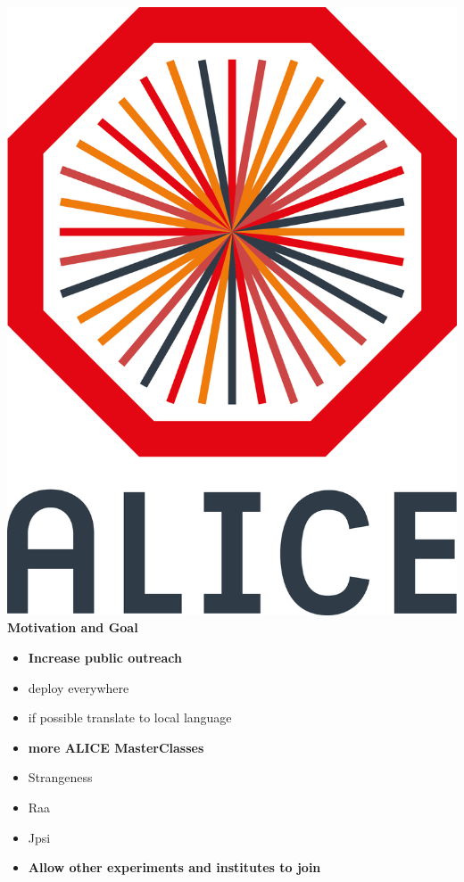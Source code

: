 \documentclass[aspectratio=1610,14pt,dvipsnames]{beamer}
\begin{document}
\begin{frame}{\includegraphics[height=0.07\textheight]{2012-Jul-04-4_Color_Logo_CB.png} \hspace{0.2cm}\textbf{Motivation and Goal}}
  \begin{itemize}
    \item<1> \textbf{Increase public outreach}
    \item<1> deploy everywhere
    \item<1> if possible translate to local language

    \item<2> \textbf{more ALICE MasterClasses}
    \item<2> Strangeness
    \item<2> Raa
    \item<2> Jpsi

    \item<3> \textbf{Allow other experiments and institutes to join}
  \end{itemize}
\end{frame}
\end{document}
